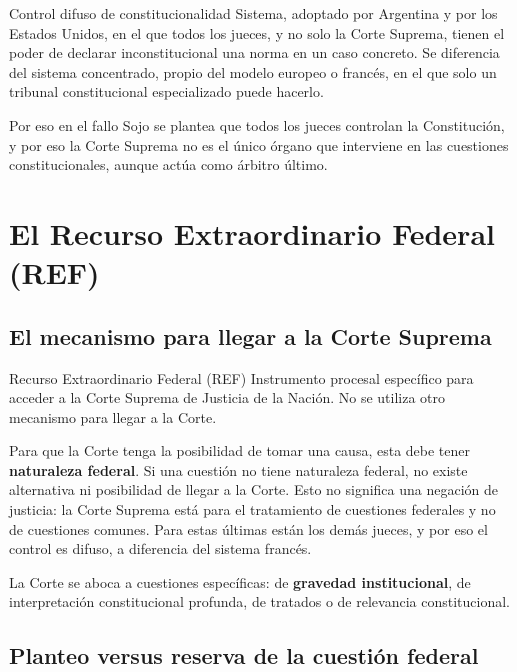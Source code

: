 \documentclass[12pt,oneside,a4paper]{book}
\begin{document}
\begin{definition}{Control difuso de constitucionalidad}
Sistema, adoptado por Argentina y por los Estados Unidos, en el que todos los jueces, y no solo la Corte Suprema, tienen el poder de declarar inconstitucional una norma en un caso concreto. Se diferencia del sistema concentrado, propio del modelo europeo o francés, en el que solo un tribunal constitucional especializado puede hacerlo.
\end{definition}

Por eso en el fallo Sojo se plantea que todos los jueces controlan la Constitución, y por eso la Corte Suprema no es el único órgano que interviene en las cuestiones constitucionales, aunque actúa como árbitro último.

\section{El Recurso Extraordinario Federal (REF)}

\subsection{El mecanismo para llegar a la Corte Suprema}

\begin{definition}{Recurso Extraordinario Federal (REF)}
Instrumento procesal específico para acceder a la Corte Suprema de Justicia de la Nación. No se utiliza otro mecanismo para llegar a la Corte.
\end{definition}

Para que la Corte tenga la posibilidad de tomar una causa, esta debe tener \textbf{naturaleza federal}. Si una cuestión no tiene naturaleza federal, no existe alternativa ni posibilidad de llegar a la Corte. Esto no significa una negación de justicia: la Corte Suprema está para el tratamiento de cuestiones federales y no de cuestiones comunes. Para estas últimas están los demás jueces, y por eso el control es difuso, a diferencia del sistema francés.

La Corte se aboca a cuestiones específicas: de \textbf{gravedad institucional}, de interpretación constitucional profunda, de tratados o de relevancia constitucional.

\subsection{Planteo versus reserva de la cuestión federal}
\end{document}
